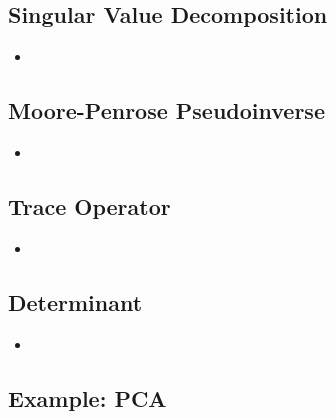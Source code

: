 \subsection{Singular Value Decomposition}
\begin{itemize}
    \item
\end{itemize}

\subsection{Moore-Penrose Pseudoinverse}
\begin{itemize}
    \item
\end{itemize}

\subsection{Trace Operator}
\begin{itemize}
    \item
\end{itemize}

\subsection{Determinant}
\begin{itemize}
    \item
\end{itemize}

\subsection{Example: PCA}

